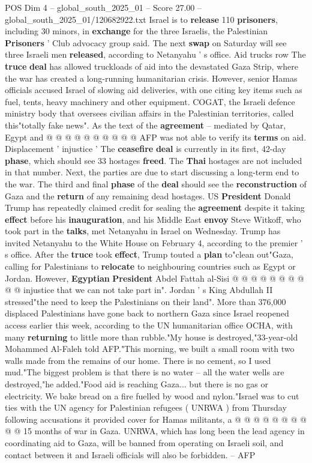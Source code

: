 \begin{textsample}{POS Dim 4 – global\_south\_2025\_01 – Score 27.00 – global\_south\_2025\_01/120682922.txt}
Israel is to \textbf{release} 110 \textbf{prisoners}, including 30 minors, in \textbf{exchange} for the three Israelis, the Palestinian \textbf{Prisoners} ' Club advocacy group said.
The next \textbf{swap} on Saturday will see three Israeli men \textbf{released}, according to Netanyahu ' s office.
Aid trucks row The \textbf{truce} \textbf{deal} has allowed truckloads of aid into the devastated Gaza Strip, where the war has created a long-running humanitarian crisis.
However, senior Hamas officials accused Israel of slowing aid deliveries, with one citing key items such as fuel, tents, heavy machinery and other equipment.
COGAT, the Israeli defence ministry body that oversees civilian affairs in the Palestinian territories, called this"totally fake news".
As the text of the \textbf{agreement} -- mediated by Qatar, Egypt and @ @ @ @ @ @ @ @ @ @ AFP was not able to verify its \textbf{terms} on aid.
Displacement ' injustice ' The \textbf{ceasefire} \textbf{deal} is currently in its first, 42-day \textbf{phase}, which should see 33 hostages \textbf{freed}.
The \textbf{Thai} hostages are not included in that number.
Next, the parties are due to start discussing a long-term end to the war.
The third and final \textbf{phase} of the \textbf{deal} should see the \textbf{reconstruction} of Gaza and the \textbf{return} of any remaining dead hostages.
US \textbf{President} Donald Trump has repeatedly claimed credit for sealing the \textbf{agreement} despite it taking \textbf{effect} before his \textbf{inauguration}, and his Middle East \textbf{envoy} Steve Witkoff, who took part in the \textbf{talks}, met Netanyahu in Israel on Wednesday.
Trump has invited Netanyahu to the White House on February 4, according to the premier ' s office.
After the \textbf{truce} took \textbf{effect}, Trump touted a \textbf{plan} to"clean out"Gaza, calling for Palestinians to \textbf{relocate} to neighbouring countries such as Egypt or Jordan.
However, \textbf{Egyptian} \textbf{President} Abdel Fattah al-Sisi @ @ @ @ @ @ @ @ @ @ injustice that we can not take part in".
Jordan ' s King Abdullah II stressed"the need to keep the Palestinians on their land".
More than 376,000 displaced Palestinians have gone back to northern Gaza since Israel reopened access earlier this week, according to the UN humanitarian office OCHA, with many \textbf{returning} to little more than rubble."My house is destroyed,"33-year-old Mohammed Al-Faleh told AFP."This morning, we built a small room with two walls made from the remains of our home.
There is no cement, so I used mud."The biggest problem is that there is no water -- all the water wells are destroyed,"he added."Food aid is reaching Gaza... but there is no gas or electricity.
We bake bread on a fire fuelled by wood and nylon."Israel was to cut ties with the UN agency for Palestinian refugees ( UNRWA ) from Thursday following accusations it provided cover for Hamas militants, a @ @ @ @ @ @ @ @ @ @ 15 months of war in Gaza.
UNRWA, which has long been the lead agency in coordinating aid to Gaza, will be banned from operating on Israeli soil, and contact between it and Israeli officials will also be forbidden. -- AFP


\end{textsample}
